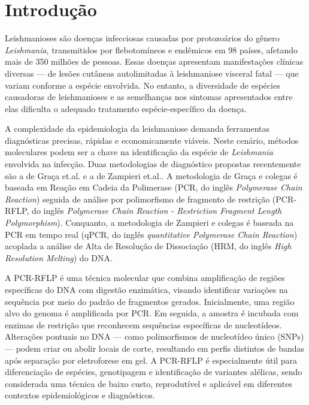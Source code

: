 \section{Introdução}

Leishmanioses são doenças infecciosas causadas por protozoários do gênero
\textit{Leishmania}, transmitidos por flebotomíneos e endêmicos em 98 países,
afetando mais de 350 milhões de pessoas\cite{hong2020one}. Essas doenças
apresentam manifestações clínicas diversas — de lesões cutâneas autolimitadas à
leishmaniose visceral fatal — que variam conforme a espécie envolvida. No
entanto, a diversidade de espécies causadoras de leishmanioses e as semelhanças
nos sintomas apresentados entre elas dificulta o adequado tratamento
espécie-específico da doença.

A complexidade da epidemiologia da leishmaniose demanda ferramentas diagnósticas
precisas, rápidas e economicamente viáveis.  Neste cenário, métodos moleculares
podem ser a chave na identificação da espécie de \textit{Leishmania} envolvida
na infecção. Duas metodologias de diagnóstico propostas recentemente são a de
Graça et.al.\cite{RFLPgraca2012} e a de Zampieri et.al.\cite{HRMzampi2016}.  A
metodologia de Graça e colegas é baseada em Reação em Cadeia da Polimerase (PCR,
do inglês \textit{Polymerase Chain Reaction}) seguida de análise por
polimorfismo de fragmento de restrição (PCR-RFLP, do inglês \textit{Polymerase
Chain Reaction - Restriction Fragment Length Polymorphism}). Conquanto, a
metodologia de Zampieri e colegas é baseada na PCR em tempo real (qPCR, do
inglês \textit{quantitative Polymerase Chain Reaction}) acoplada
a análise de Alta de Resolução de Dissociação (HRM, do inglês \textit{High
Resolution Melting}) do DNA. 

A PCR-RFLP é uma técnica molecular que combina amplificação de regiões
específicas do DNA com digestão enzimática, visando identificar variações na
sequência por meio do padrão de fragmentos gerados. Inicialmente, uma região
alvo do genoma é amplificada por PCR. Em seguida, a amostra é incubada com
enzimas de restrição que reconhecem sequências específicas de nucleotídeos.
Alterações pontuais no DNA — como polimorfismos de nucleotídeo único (SNPs) —
podem criar ou abolir locais de corte, resultando em perfis distintos de bandas
após separação por eletroforese em gel. A PCR-RFLP é especialmente útil para
diferenciação de espécies, genotipagem e identificação de variantes alélicas,
sendo considerada uma técnica de baixo custo, reprodutível e aplicável em
diferentes contextos epidemiológicos e diagnósticos\cite{garcia2005metodos}.

